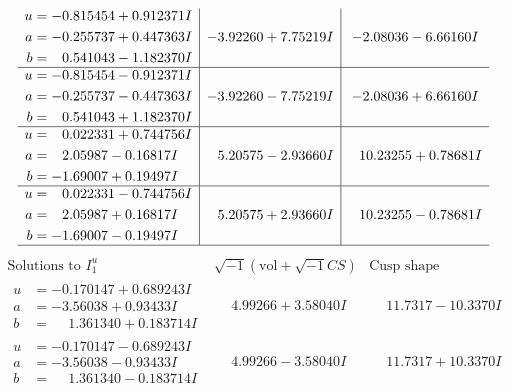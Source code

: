 \documentclass[1p]{elsarticle_modified}
\theoremstyle{definition}
\newcommand{\I}{\sqrt{-1}}
\begin{document}
$$\begin{array}{c|c|c}
\begin{aligned}
u &= -0.815454 + 0.912371 I \\
a &= -0.255737 + 0.447363 I \\
b &= \phantom{-}0.541043 - 1.182370 I\end{aligned}
 & -3.92260 + 7.75219 I & -2.08036 - 6.66160 I \\ \hline\begin{aligned}
u &= -0.815454 - 0.912371 I \\
a &= -0.255737 - 0.447363 I \\
b &= \phantom{-}0.541043 + 1.182370 I\end{aligned}
 & -3.92260 - 7.75219 I & -2.08036 + 6.66160 I \\ \hline\begin{aligned}
u &= \phantom{-}0.022331 + 0.744756 I \\
a &= \phantom{-}2.05987 - 0.16817 I \\
b &= -1.69007 + 0.19497 I\end{aligned}
 & \phantom{-}5.20575 - 2.93660 I & \phantom{-}10.23255 + 0.78681 I \\ \hline\begin{aligned}
u &= \phantom{-}0.022331 - 0.744756 I \\
a &= \phantom{-}2.05987 + 0.16817 I \\
b &= -1.69007 - 0.19497 I\end{aligned}
 & \phantom{-}5.20575 + 2.93660 I & \phantom{-}10.23255 - 0.78681 I\\
 \hline 
 \end{array}$$\newpage$$\begin{array}{c|c|c}  
\text{Solutions to }I^u_{1}& \I (\text{vol} + \sqrt{-1}CS) & \text{Cusp shape}\\
 \hline 
\begin{aligned}
u &= -0.170147 + 0.689243 I \\
a &= -3.56038 + 0.93433 I \\
b &= \phantom{-}1.361340 + 0.183714 I\end{aligned}
 & \phantom{-}4.99266 + 3.58040 I & \phantom{-}11.7317 - 10.3370 I \\ \hline\begin{aligned}
u &= -0.170147 - 0.689243 I \\
a &= -3.56038 - 0.93433 I \\
b &= \phantom{-}1.361340 - 0.183714 I\end{aligned}
 & \phantom{-}4.99266 - 3.58040 I & \phantom{-}11.7317 + 10.3370 I \\ \hline\begin{aligned}

\end{aligned}
\end{array}$$
\end{document}
